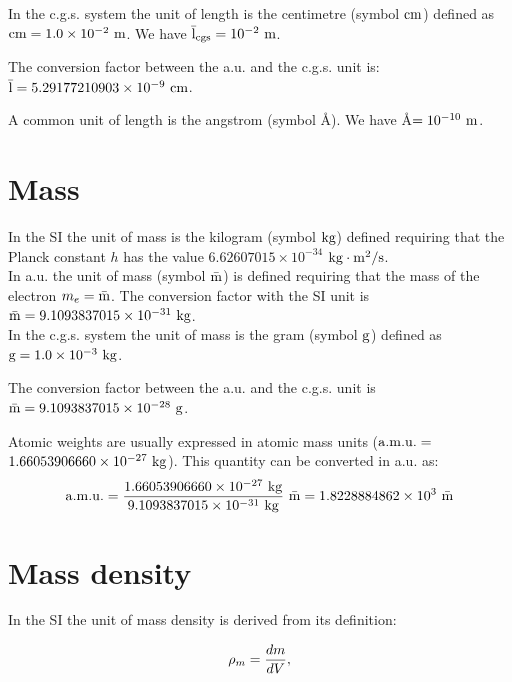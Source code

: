 \documentclass[12pt,a4paper,twoside]{report}
\def\hplanck{6.62607015\times 10^{-34}}
\def\amu{1.66053906660\times 10^{-27}}
\def\me{9.1093837015\times 10^{-31}}
\def\barm{9.1093837015\times 10^{-31}}
\def\cmtom{1.0\times 10^{-2}}
\def\gtokg{1.0\times 10^{-3}}
\def\barlcgs{5.29177210903\times 10^{-9}}
\def\barmcgs{9.1093837015\times 10^{-28}}
\def\amuau{1.8228884862\times 10^{3}}
\begin{document}
{\color{orange} In the c.g.s. system the unit of length is the centimetre 
(symbol ${\rm cm}$) defined as ${\rm cm} =\cmtom\ {\rm m}$. We have ${\rm \bar l_{cgs}}=10^{-2}\ {\rm m}$.
\\
}

{\color{green} The conversion factor between the a.u. and the c.g.s. unit is:
${\rm \bar l}=\barlcgs\ {\rm cm}$.
\\
}

{\color{red} A common unit of length is the angstrom (symbol \AA).
We have \AA$=10^{-10}\ {\rm m}$.
}

\newpage

{\color{coral}\section{Mass}}
\color{black}
In the SI the unit of mass is the kilogram (symbol ${\rm kg}$) defined
requiring that the Planck constant $h$ has the value
$\hplanck$ ${\rm kg} \cdot {\rm m}^2 / {\rm s}$. 
\\

{\color{web-blue} In a.u. the unit of mass (symbol ${\rm \bar m}$) is defined
requiring that the mass of the electron $m_e= {\rm \bar m}$. The conversion
factor with the SI unit is ${\rm \bar m} = \me\ {\rm kg}$.
}
\\

{\color{orange} In the c.g.s. system the unit of mass is the gram 
(symbol ${\rm g}$) defined as ${\rm g} =\gtokg\ {\rm kg}$. 
\\
}

{\color{green} The conversion factor between the a.u. and the c.g.s. unit is
${\rm \bar m}=\barmcgs\ {\rm g}$.
\\
}

{\color{red} Atomic weights are usually expressed in atomic mass units
(${\rm a.m.u.}=$ \\ $\amu\ {\rm kg}$). This quantity can be converted in a.u. as:
\begin{equation}
{\rm a.m.u.} = {\amu\ {\rm kg} \over \barm\ {\rm kg} }\ {\rm \bar m}=\amuau\ {\rm \bar m}
\end{equation}
}

\newpage
{\color{coral}\section{Mass density}}
\color{black}
In the SI the unit of mass density is derived from its definition:

\begin{tcolorbox}
\begin{equation}
\rho_m= {d m \over d V},
\end{equation}
\end{tcolorbox}
\end{document}

